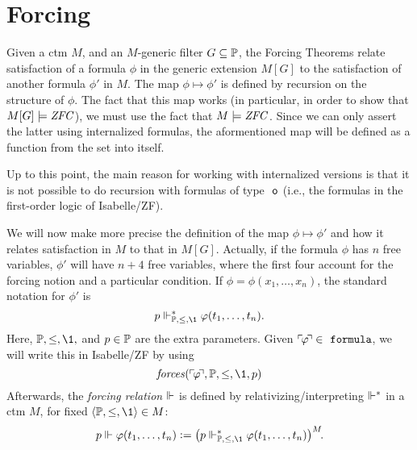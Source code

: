 \section{Forcing}
Given a ctm $M$, and an $M$-generic filter $G\subseteq\mathbb{P}$, the Forcing
Theorems relate satisfaction of a formula 
$\phi$ in the generic extension $M[G]$ to the satisfaction of another
formula $\phi'$ in $M$. The map $\phi\mapsto\phi'$ is defined by
recursion on 
the structure of $\phi$. The fact that this map works (in particular,
in order to show that $M[G]\models\mathit{ZFC}$), we must use the fact that
$M\models\mathit{ZFC}$. Since we can only assert the latter using internalized
formulas, the aformentioned map will be defined as a function from the
set \formula{} into itself. 

Up to this point, the main reason for working with internalized
versions is that  it is not possible to do recursion with formulas of
type $\tyo$ (i.e., the formulas in the first-order logic of
Isabelle/ZF).

We will now make more precise the definition of the map
$\phi\mapsto\phi'$ and how it relates satisfaction in $M$ to that in
$M[G]$. Actually, if the formula $\phi$ has $n$ free variables,
$\phi'$ will have $n+4$ free variables, where the first four account
for the forcing notion and a particular condition. If
$\phi=\phi(x_1,\dots,x_n)$, the standard notation for $\phi'$ is
\[
p\forces_{\PP,\leq,\1}^* \phi(t_1,\dots,t_n).
\]
Here, $\PP,\leq,\1,$ and $p\in\mathbb{P}$ are the extra parameters. 
Given $\quine\phi\in\formula$, we will write this  in
Isabelle/ZF by using  
\[
\forceisa(\quine\phi,\PP,\leq,\1,p)
\]
Afterwards, the \emph{forcing relation} $\Vdash$ is defined by
relativizing/interpreting $\Vdash^*$ in a ctm $M$, for fixed
$\lb\PP,\leq,\1\rb\in M$:
\[
p\forces \phi(t_1,\dots,t_n) \defi 
\bigl(p\forces_{\PP,\leq,\1}^* \phi(t_1,\dots,t_n)\bigr)^M\!.
\]

